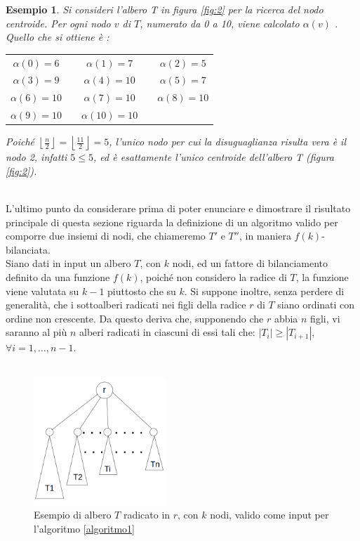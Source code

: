 \newtheorem{esempio}[definizione]{Esempio}
\begin{esempio}
	\label{es1}
Si consideri l'albero T in figura \ref{fig:2} per la ricerca del nodo centroide.
Per ogni nodo $ v $ di $ T $, numerato da 0 a 10,  viene calcolato $\alpha(v)$ . \\
Quello che si ottiene \`e :


\begin{center}
	\begin{tabular}{ c c c c c  }
		$\alpha(0) = 6$ & & $\alpha(1) = 7$ & & $\alpha(2) = 5$ \\ 
		$\alpha(3) = 9$ && $\alpha(4) = 10$ &&  $\alpha(5) =  7$ \\  
		$\alpha(6) = 10$ && $\alpha(7) = 10$ && $\alpha(8) = 10$ \\
		$\alpha(9) = 10$ && $\alpha(10) = 10$ &&
	\end{tabular}
\end{center}

Poich\'e $ \left\lfloor\frac{n}{2} \right\rfloor = \left\lfloor \frac{11}{2} \right\rfloor = 5$, l'unico nodo per cui la disuguaglianza risulta vera \`e il nodo 2, infatti $5\le 5$, ed \`e esattamente l'unico centroide dell'albero T (figura \ref{fig:2}). 
\demo
\end{esempio}\mbox{}\\

L'ultimo punto da considerare prima di poter enunciare e dimostrare il risultato principale di questa sezione riguarda la definizione di un algoritmo valido per comporre due insiemi di nodi, che chiameremo $ T' $ e $ T'' $, in maniera $ f(k) $-bilanciata.\\
Siano dati in input un albero $ T $, con $ k $ nodi, ed un fattore di bilanciamento definito da una funzione $ f(k) $, poich\'e non considero la radice di $ T $, la funzione viene valutata su $ k-1 $ piuttosto che su $ k $.
Si suppone inoltre, senza perdere di generalit\`a, che i sottoalberi radicati nei figli della radice $ r $ di $ T $ siano ordinati con ordine non crescente.
Da questo deriva che, supponendo che $ r $ abbia $ n $ figli, vi saranno al pi\`u $  n $ alberi radicati in ciascuni di essi tali che: $ |T_i| \ge |T_{i+1}|$, $ \forall i = 1,\dots, n-1 $.\mbox{}\\\\

	\begin{figure}[htbp]
	\centering
	\includegraphics[width=5cm]{capitolo3/grafo3}
	\caption{Esempio di albero $ T $ radicato in $ r $, con $ k $ nodi, valido come input per l'algoritmo \ref{algoritmo1}} 
	\label{fig:3}
\end{figure}
\mbox{}\\

